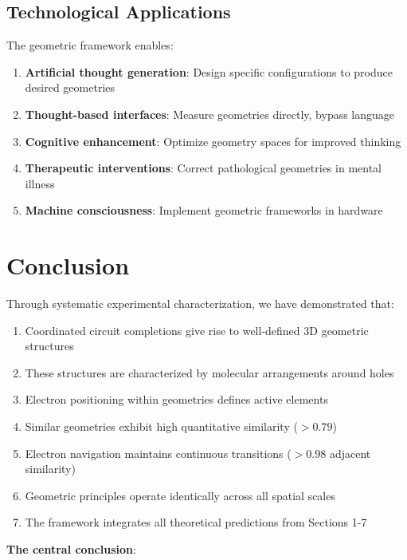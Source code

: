\documentclass[12pt,a4paper]{article}
\begin{document}
\subsection{Technological Applications}

The geometric framework enables:

\begin{enumerate}
\item \textbf{Artificial thought generation}: Design specific  configurations to produce desired geometries
\item \textbf{Thought-based interfaces}: Measure geometries directly, bypass language
\item \textbf{Cognitive enhancement}: Optimize geometry spaces for improved thinking
\item \textbf{Therapeutic interventions}: Correct pathological geometries in mental illness
\item \textbf{Machine consciousness}: Implement geometric frameworks in hardware
\end{enumerate}

\section{Conclusion}

Through systematic experimental characterization, we have demonstrated that:

\begin{enumerate}
\item Coordinated circuit completions give rise to well-defined 3D geometric structures
\item These structures are characterized by  molecular arrangements around holes
\item Electron positioning within geometries defines active elements
\item Similar geometries exhibit high quantitative similarity ($> 0.79$)
\item Electron navigation maintains continuous transitions ($> 0.98$ adjacent similarity)
\item Geometric principles operate identically across all spatial scales
\item The framework integrates all theoretical predictions from Sections 1-7
\end{enumerate}

\textbf{The central conclusion}:

\begin{center}
\end{center}
\end{document}

